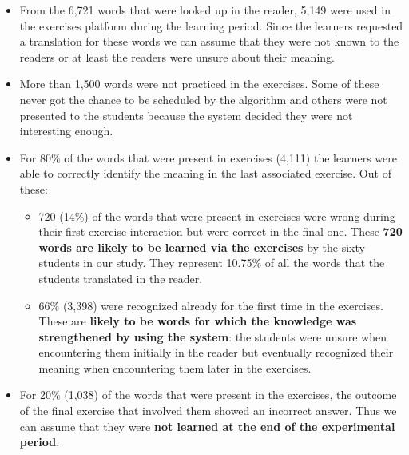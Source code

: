   \begin{itemize}
    \item From the 6,721 words that were looked up in the reader, 5,149 were used in the exercises platform during the learning period. Since the learners requested a translation for these words we can assume that they were not known to the readers or at least the readers were unsure about their meaning. 

    \item More than 1,500 words were not practiced in the exercises. Some of these never got the chance to be scheduled by the algorithm and others were not presented to the students because the system decided they were not interesting enough. 

    \item For 80\% of the words that were present in exercises (4,111) the learners were able to correctly identify the meaning in the last associated exercise. Out of these: 

    \begin{itemize}
      \item 720 (14\%) of the words that were present in exercises were wrong during their first exercise interaction but were correct in the final one. These {\bf 720 words are likely to be learned via the exercises} by the sixty students in our study. They represent 10.75\% of all the words that the students translated in the reader.

      \item 66\% (3,398) were recognized already for the first time in the exercises. These are {\bf likely to be words for which the knowledge was strengthened by using the system}: the students were unsure when encountering them initially in the reader but eventually recognized their meaning when encountering them later in the exercises. 
    \end{itemize}

  \item For 20\% (1,038) of the words that were present in the exercises, the outcome of the final exercise that involved them showed an incorrect answer. Thus we can assume that they were {\bf not learned at the end of the experimental period}.

  \end{itemize}















